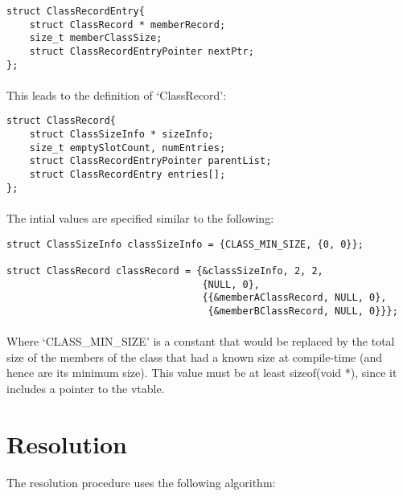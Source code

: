 \documentclass{article}
\begin{document}
\begin{verbatim}
struct ClassRecordEntry{
    struct ClassRecord * memberRecord;
    size_t memberClassSize;
    struct ClassRecordEntryPointer nextPtr;
};
\end{verbatim}

\paragraph{}
This leads to the definition of `ClassRecord':

\begin{verbatim}
struct ClassRecord{
    struct ClassSizeInfo * sizeInfo;
    size_t emptySlotCount, numEntries;
    struct ClassRecordEntryPointer parentList;
    struct ClassRecordEntry entries[];
};
\end{verbatim}

\paragraph{}
The intial values are specified similar to the following:

\begin{verbatim}
struct ClassSizeInfo classSizeInfo = {CLASS_MIN_SIZE, {0, 0}};

struct ClassRecord classRecord = {&classSizeInfo, 2, 2,
                                  {NULL, 0},
                                  {{&memberAClassRecord, NULL, 0},
                                   {&memberBClassRecord, NULL, 0}}};
\end{verbatim}

\paragraph{}
Where `CLASS\_MIN\_SIZE' is a constant that would be replaced by the total size of the members of the class that had a known size at compile-time (and hence are its minimum size). This value must be at least sizeof(void *), since it includes a pointer to the vtable.

\section{Resolution}

\paragraph{}
The resolution procedure uses the following algorithm:
\end{document}
